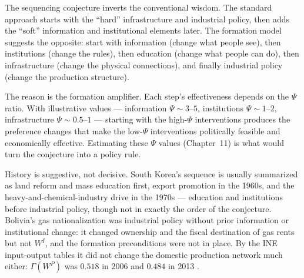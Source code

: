 \documentclass[../structural_economics_book.tex]{subfiles}
\begin{document}
\begin{keyinsight}
The sequencing conjecture inverts the conventional wisdom. The standard approach starts with the ``hard'' infrastructure and industrial policy, then adds the ``soft'' information and institutional elements later. The formation model suggests the opposite: start with information (change what people see), then institutions (change the rules), then education (change what people can do), then infrastructure (change the physical connections), and finally industrial policy (change the production structure).

The reason is the formation amplifier. Each step's effectiveness depends on the $\Psi$ ratio. With illustrative values --- information $\Psi \sim 3$--$5$, institutions $\Psi \sim 1$--$2$, infrastructure $\Psi \sim 0.5$--$1$ --- starting with the high-$\Psi$ interventions produces the preference changes that make the low-$\Psi$ interventions politically feasible and economically effective. Estimating these $\Psi$ values (Chapter~11) is what would turn the conjecture into a policy rule.

History is suggestive, not decisive. South Korea's sequence is usually summarized as land reform and mass education first, export promotion in the 1960s, and the heavy-and-chemical-industry drive in the 1970s --- education and institutions before industrial policy, though not in exactly the order of the conjecture. Bolivia's gas nationalization was industrial policy without prior information or institutional change: it changed ownership and the fiscal destination of gas rents but not $W^I$, and the formation preconditions were not in place. By the INE input-output tables it did not change the domestic production network much either: $\Gamma(W^P)$ was $0.518$ in 2006 and $0.484$ in 2013 \citep{ine2026sut}.
\end{keyinsight}
\end{document}
